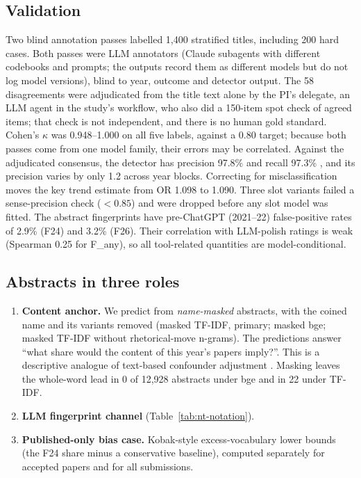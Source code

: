 \subsection{Validation}
\label{sec:nt-validation}
Two blind annotation passes labelled 1,400 stratified titles, including 200 hard cases. Both passes were LLM annotators (Claude subagents with different codebooks and prompts; the outputs record them as different models but do not log model versions), blind to year, outcome and detector output. The 58 disagreements were adjudicated from the title text alone by the PI's delegate, an LLM agent in the study's workflow, who also did a 150-item spot check of agreed items; that check is not independent, and there is no human gold standard. Cohen's $\kappa$ was 0.948--1.000 on all five labels, against a 0.80 target; because both passes come from one model family, their errors may be correlated. Against the adjudicated consensus, the \NAME{} detector has precision 97.8\%  and recall 97.3\% , and its precision varies by only 1.2\pp{} across year blocks. Correcting for misclassification moves the key trend estimate from OR 1.098 to 1.090. Three slot variants failed a sense-precision check ($<0.85$) and were dropped before any slot model was fitted. The abstract fingerprints have pre-ChatGPT (2021--22) false-positive rates of 2.9\% (F24) and 3.2\% (F26). Their correlation with LLM-polish ratings is weak (Spearman 0.25 for F\_any), so all tool-related quantities are model-conditional.

\subsection{Abstracts in three roles}
\label{sec:nt-abstracts}
\begin{enumerate}
\item \textbf{Content anchor.} We predict \NAME{} from \emph{name-masked} abstracts, with the coined name and its variants removed (masked TF-IDF, primary; masked bge; masked TF-IDF without rhetorical-move n-grams). The predictions answer ``what \NAME{} share would the content of this year's papers imply?''. This is a descriptive analogue of text-based confounder adjustment \citep{keith2020text}. Masking leaves the whole-word lead in 0 of 12,928 \NAME{} abstracts under bge and in 22 under TF-IDF.
\item \textbf{LLM fingerprint channel} (Table~\ref{tab:nt-notation}).
\item \textbf{Published-only bias case.} Kobak-style excess-vocabulary lower bounds \citep{kobak2025delving} (the F24 share minus a conservative baseline), computed separately for accepted papers and for all submissions.
\end{enumerate}

